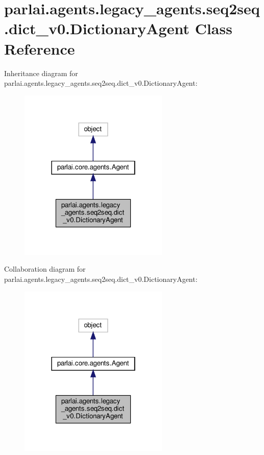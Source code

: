 \hypertarget{classparlai_1_1agents_1_1legacy__agents_1_1seq2seq_1_1dict__v0_1_1DictionaryAgent}{}\section{parlai.\+agents.\+legacy\+\_\+agents.\+seq2seq.\+dict\+\_\+v0.\+Dictionary\+Agent Class Reference}
\label{classparlai_1_1agents_1_1legacy__agents_1_1seq2seq_1_1dict__v0_1_1DictionaryAgent}


Inheritance diagram for parlai.\+agents.\+legacy\+\_\+agents.\+seq2seq.\+dict\+\_\+v0.\+Dictionary\+Agent\+:\nopagebreak
\begin{figure}[H]
\begin{center}
\leavevmode
\includegraphics[width=202pt]{d3/d78/classparlai_1_1agents_1_1legacy__agents_1_1seq2seq_1_1dict__v0_1_1DictionaryAgent__inherit__graph}
\end{center}
\end{figure}


Collaboration diagram for parlai.\+agents.\+legacy\+\_\+agents.\+seq2seq.\+dict\+\_\+v0.\+Dictionary\+Agent\+:
\nopagebreak
\begin{figure}[H]
\begin{center}
\leavevmode
\includegraphics[width=202pt]{d5/d36/classparlai_1_1agents_1_1legacy__agents_1_1seq2seq_1_1dict__v0_1_1DictionaryAgent__coll__graph}
\end{center}
\end{figure}
